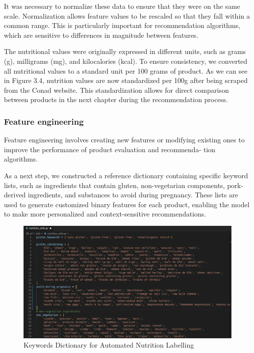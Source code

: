 \par It was necessary to normalize these data to ensure that they were on
the same scale. Normalization allows feature values to be rescaled so
that they fall within a common range. This is particularly important
for recommendation algorithms, which are sensitive to differences in
magnitude between features.

\par The nutritional values were originally expressed in different units, such as
grams (g), milligrams (mg), and kilocalories (kcal). To ensure consistency,
we converted all nutritional values to a standard unit per 100 grams
of product. As we can see in Figure 3.4, nutrition values are now
standardized per 100g after being scraped from the Conad website. This
standardization allows for direct comparison between products in the
next chapter during the recommendation process.

\subsubsection{Feature engineering}
\par Feature engineering involves creating new features or modifying existing
ones to improve the performance of product evaluation and recommenda-
tion algorithms.

\par As a next step, we constructed a reference dictionary containing specific
keyword lists, such as ingredients that contain gluten, non-vegetarian
components, pork-derived ingredients, and substances to avoid during
pregnancy. These lists are used to generate customized binary features
for each product, enabling the model to make more personalized and
context-sensitive recommendations.

\begin{center}
\begin{figure}[H]
    \includegraphics[scale=0.45]{images/nutrition_utils.png}
    \caption{Keywords Dictionary for Automated Nutrition Labelling} 
    \label{fig:nutrition_utils_file}
\end{figure}
\end{center}

